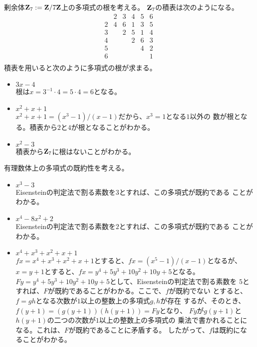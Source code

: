{	\begin{example}[多項式の根その一]\label{eg:多項式の根その一} %
		剰余体$\mathbf{Z}_7:=\mathbf{Z}/7\mathbf{Z}$上の多項式の根を考える。
		$\mathbf{Z}_7$の積表は次のようになる。
		\begin{equation*}\begin{array}{r|rrrrrr}
			& 2 & 3 & 4 & 5 & 6 \\\hline
			2 & 4 & 6 & 1 & 3 & 5 \\
			3 & & 2 & 5 & 1 & 4 \\
			4 & & & 2 & 6 & 3 \\
			5 & & & & 4 & 2 \\
			6 & & & & & 1 \\
		\end{array}\end{equation*}
		積表を用いると次のように多項式の根が求まる。
		\begin{itemize}\setlength{\itemsep}{-1mm} %
			\item $3x-4$ \\
			根は$x=3^{-1}\cdot4=5\cdot4=6$となる。
			\item $x^2+x+1$ \\
			$x^2+x+1=(x^3-1)/(x-1)$だから、$x^3=1$となる$1$以外の
			数が根となる。積表から$2$と$4$が根となることがわかる。
			\item $x^2-3$ \\
			積表から$\mathbf{Z}_7$に根はないことがわかる。
		\end{itemize} %
	\end{example} %

	\begin{example}[既約な多項式その二]\label{eg:既約な多項式その二} %
		有理数体上の多項式の既約性を考える。
		\begin{itemize}\setlength{\itemsep}{-1mm} %
			\item $x^3-3$ \\
			Eisensteinの判定法で割る素数を$3$とすれば、この多項式が既約である
			ことがわかる。
			\item $x^4-8x^2+2$ \\
			Eisensteinの判定法で割る素数を$2$とすれば、この多項式が既約である
			ことがわかる。
			\item $x^4+x^3+x^2+x+1$ \\
			$fx=x^4+x^3+x^2+x+1$とすると、$fx=(x^5-1)/(x-1)$となるが、
			$x=y+1$とすると、$fx=y^4+5y^3+10y^2+10y+5$となる。
			$Fy=y^4+5y^3+10y^2+10y+5$として、Eisensteinの判定法で割る素数を
			$5$とすれば、$F$が既約であることがわかる。ここで、$f$が既約でない
			とすると、$f=gh$となる次数が$1$以上の整数上の多項式$g,h$が存在
			するが、そのとき、$f(y+1)=(g(y+1))(h(y+1))=Fy$となり、
			$Fy$が$g(y+1)$と$h(y+1)$の二つの次数が$1$以上の整数上の多項式の
			乗法で書かれることになる。これは、$F$が既約であることに矛盾する。
			したがって、$f$は既約になることがわかる。
		\end{itemize} %
	\end{example} %

}
